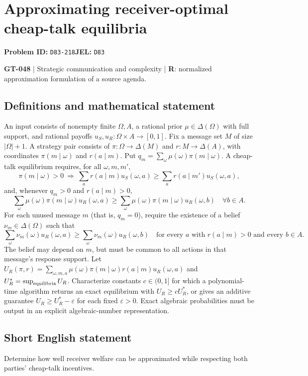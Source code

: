 \documentclass[11pt,a4paper]{article}
\begin{document}
\section*{Approximating receiver-optimal cheap-talk equilibria}
\textbf{Problem ID:} \texttt{D83-218}\quad \textbf{JEL:} \texttt{D83}\par
\label{problem:OP-0178}
\label{game:GT-048}
{\sffamily\small\color{muted}
\textbf{GT-048} | Strategic communication and complexity | \textbf{R}: normalized approximation formulation of a source agenda.
\par}
\subsection*{Definitions and mathematical statement}
An input consists of nonempty finite $\Omega,A$, a rational prior $\mu\in\Delta(\Omega)$ with full support, and rational payoffs $u_S,u_R:\Omega\times A\to[0,1]$. Fix a message set $M$ of size $|\Omega|+1$. A strategy pair consists of $\pi:\Omega\to\Delta(M)$ and $r:M\to\Delta(A)$, with coordinates $\pi(m\mid\omega)$ and $r(a\mid m)$. Put $q_m=\sum_\omega\mu(\omega)\pi(m\mid\omega)$. A cheap-talk equilibrium requires, for all $\omega,m,m'$,
\[
 \pi(m\mid\omega)>0\ \Longrightarrow\
 \sum_a r(a\mid m)u_S(\omega,a)\geq\sum_a r(a\mid m')u_S(\omega,a),
\]
and, whenever $q_m>0$ and $r(a\mid m)>0$,
\[
 \sum_\omega\mu(\omega)\pi(m\mid\omega)u_R(\omega,a)
 \geq\sum_\omega\mu(\omega)\pi(m\mid\omega)u_R(\omega,b)
 \quad\forall b\in A.
\]
For each unused message $m$ (that is, $q_m=0$), require the existence of a belief $\nu_m\in\Delta(\Omega)$ such that
\[
 \sum_\omega\nu_m(\omega)u_R(\omega,a)
 \geq\sum_\omega\nu_m(\omega)u_R(\omega,b)
 \quad\text{for every $a$ with $r(a\mid m)>0$ and every $b\in A$}.
\]
The belief may depend on $m$, but must be common to all actions in that message's response support. Let $U_R(\pi,r)=\sum_{\omega,m,a}\mu(\omega)\pi(m\mid\omega)r(a\mid m)u_R(\omega,a)$ and $U_R^*=\sup_{\rm equilibria}U_R$. Characterize constants $c\in(0,1]$ for which a polynomial-time algorithm returns an exact equilibrium with $U_R\geq cU_R^*$, or gives an additive guarantee $U_R\geq U_R^*-\varepsilon$ for each fixed $\varepsilon>0$. Exact algebraic probabilities must be output in an explicit algebraic-number representation.
\subsection*{Short English statement}
Determine how well receiver welfare can be approximated while respecting both parties' cheap-talk incentives.
\end{document}
